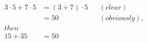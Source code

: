 \documentclass{article}
\begin{document}
\vspace*{\fill} \vspace*{-5ex}
\begin{align*}
3\cdot 5+7\cdot 5&=(3+7)
\cdot5 &&(clear)\\
&=50&&(obviously),\\
then\\
15+35 &=50
\end{align*}
\vspace*{\fill}
\end{document}
